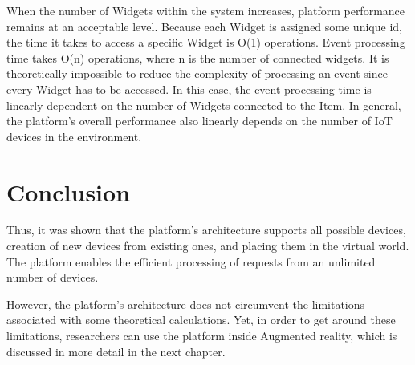 When the number of Widgets within the system increases, platform performance remains at an acceptable level. Because each Widget is assigned some unique id, the time it takes to access a specific Widget is O(1) operations. Event processing time takes O(n) operations, where n is the number of connected widgets. It is theoretically impossible to reduce the complexity of processing an event since every Widget has to be accessed. In this case, the event processing time is linearly dependent on the number of Widgets connected to the Item. In general, the platform's overall performance also linearly depends on the number of IoT devices in the environment.

\section{Conclusion}

Thus, it was shown that the platform's architecture supports all possible devices, creation of new devices from existing ones, and placing them in the virtual world. The platform enables the efficient processing of requests from an unlimited number of devices.

However, the platform's architecture does not circumvent the limitations associated with some theoretical calculations. Yet, in order to get around these limitations, researchers can use the platform inside Augmented reality, which is discussed in more detail in the next chapter.